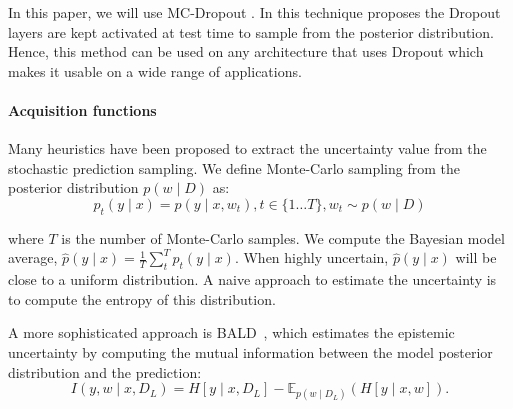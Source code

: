 \documentclass{article}
\newcommand{\E}{{\mathbb E}}
\begin{document}

In this paper, we will use MC-Dropout \citep{gal2016dropout}. In this technique proposes the Dropout layers are kept activated at test time to sample from the posterior distribution. Hence, this method can be used on any architecture that uses Dropout which makes it usable on a wide range of applications.


\paragraph{Acquisition functions}
Many heuristics have been proposed to extract the uncertainty value from the stochastic prediction sampling. We define  Monte-Carlo sampling from the posterior distribution $p(w\mid D)$ as:
\begin{equation*}
    p_t(y \mid x) = p(y \mid x, w_t), t \in \{1 \ldots T\}, w_t \sim p(w\mid D)
\end{equation*}

where $T$ is the number of Monte-Carlo samples. %
We compute the Bayesian model average, $\hat p(y \mid x) = \frac{1}{T} \sum_t^T p_t(y \mid x)$. When highly uncertain, $\hat p(y \mid x)$ will be close to a uniform distribution. A naive approach to estimate the uncertainty is to compute the entropy of this distribution.



A more sophisticated approach is BALD~\citep{houlsby2011bayesian}, which estimates the epistemic uncertainty by computing the mutual information between the model posterior distribution and the prediction:
\begin{equation*}
    I(y, w \mid x, D_L) = H[y \mid x, D_L] - \E_{p(w \mid D_L)}(H[y \mid x, w]).
\end{equation*}
\end{document}
